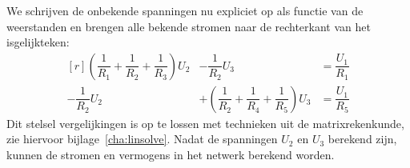 We schrijven de onbekende spanningen nu expliciet op als functie van de weerstanden en brengen alle bekende stromen naar de rechterkant van het isgelijkteken: 
%
%
%
%
%
\begin{equation}
\begin{matrix*}[r]
\left(\dfrac{1}{R_1} + \dfrac{1}{R_2} + \dfrac{1}{R_3}\right)U_2 & - \dfrac{1}{R_2}U_3 &= \dfrac{U_1}{R_1} \\[1em]
-\dfrac{1}{R_2}U_2 & + \left(\dfrac{1}{R_2}+\dfrac{1}{R_4}+\dfrac{1}{R_5}\right)U_3 &= \dfrac{U_1}{R_5}
\end{matrix*}
\end{equation}
%
Dit stelsel vergelijkingen is op te lossen met technieken uit de matrixrekenkunde, zie hiervoor bijlage~\ref{cha:linsolve}. Nadat de spanningen $U_2$ en $U_3$ berekend zijn, kunnen de stromen en vermogens in het netwerk berekend worden.

